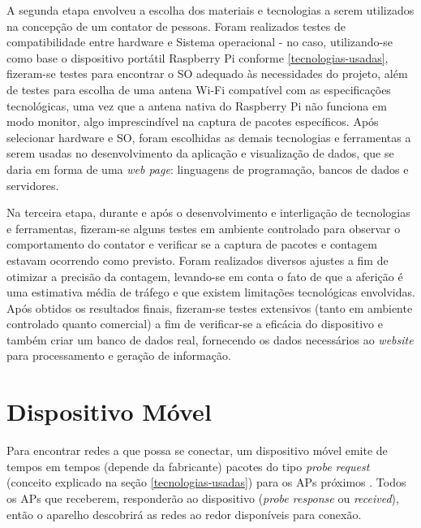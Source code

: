 A segunda etapa envolveu a escolha dos materiais e tecnologias a serem utilizados na concepção de um contator de pessoas. Foram realizados testes de compatibilidade entre hardware e Sistema operacional - no caso, utilizando-se como base o dispositivo portátil Raspberry Pi conforme \autoref{tecnologias-usadas}, fizeram-se testes para encontrar o SO adequado às necessidades do projeto, além de testes para escolha de uma antena Wi-Fi compatível com as especificações tecnológicas, uma vez que a antena nativa do Raspberry Pi não funciona em modo monitor, algo imprescindível na captura de pacotes específicos. Após selecionar hardware e SO, foram escolhidas as demais tecnologias e ferramentas a serem usadas no desenvolvimento da aplicação e visualização de dados, que se daria em forma de uma \emph{web page}: linguagens de programação, bancos de dados e servidores.

Na terceira etapa, durante e após o desenvolvimento e interligação de tecnologias e ferramentas, fizeram-se alguns testes em ambiente controlado para observar o comportamento do  contator e verificar se a captura de pacotes e contagem estavam ocorrendo como previsto. Foram realizados diversos ajustes a fim de otimizar a precisão da contagem, levando-se em conta o fato de que a aferição é uma estimativa média de tráfego e que existem limitações tecnológicas envolvidas. Após obtidos os resultados finais, fizeram-se testes extensivos (tanto em ambiente controlado quanto comercial) a fim de verificar-se a eficácia do dispositivo e também criar um banco de dados real, fornecendo os dados necessários ao \emph{website} para processamento e geração de informação.

\section{Dispositivo Móvel}
\label{smartphone-probe}
Para encontrar redes a que possa se conectar, um dispositivo móvel emite de tempos em tempos (depende da fabricante) pacotes do tipo \emph{probe request} (conceito explicado na seção \autoref{tecnologias-usadas}) para os APs próximos \cite{Meraki}. Todos os APs que receberem, responderão ao dispositivo (\emph{probe response} ou \emph{received}), então o aparelho descobrirá as redes ao redor disponíveis para conexão.



